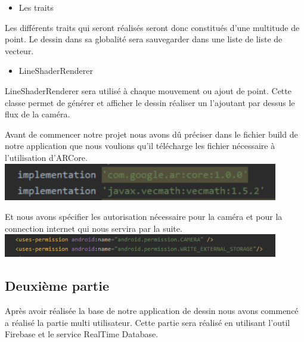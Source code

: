 \documentclass[12pt]{article}
\begin{document}
	\begin{itemize}
		\item Les traits
	\end{itemize}
	\par
	Les différents traits qui seront réalisés seront donc constitués d'une multitude de point. Le dessin dans sa globalité sera sauvegarder dans une liste de liste de vecteur.

	\begin{itemize}
		\item LineShaderRenderer
	\end{itemize}
	\par
	LineShaderRenderer sera utilisé à chaque mouvement ou ajout de point. Cette classe permet de générer et afficher le dessin réaliser un l'ajoutant par dessus le flux de la caméra.
	\par
	Avant de commencer notre projet nous avons dû préciser dans le fichier build de notre application que nous voulions qu'il télécharge les fichier nécessaire à l'utilisation d’ARCore. 
	\newline
	\includegraphics[width=0.9\textwidth]{Capture7.png}
	\newline
	\par
	Et nous avons spécifier les autorisation nécessaire pour la caméra et pour la connection internet qui nous servira par la suite.
	\newline
	\includegraphics[width=0.9\textwidth]{Capture6.png}
	\newline
	\subsection{Deuxième partie}
	\par
	Après avoir réalisée la base de notre application de dessin nous avons commencé a réalisé la partie multi utilisateur. Cette partie sera réalisé en utilisant l'outil Firebase et le service RealTime Database.
\end{document}
